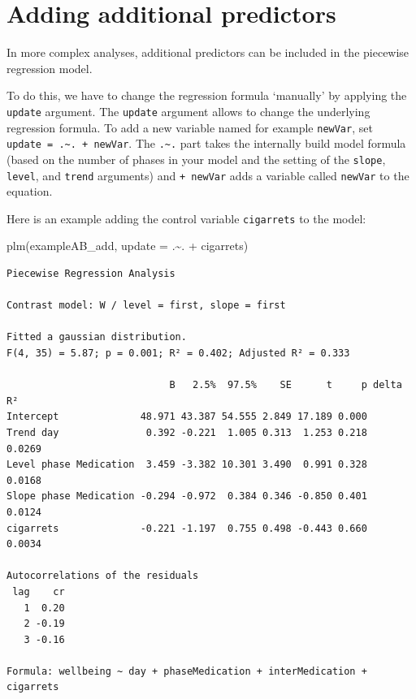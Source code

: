 \documentclass[
  letterpaper,
  DIV=11,
  numbers=noendperiod]{scrreprt}
\newenvironment{Shaded}{\begin{snugshade}}{\end{snugshade}}
\newcommand{\AttributeTok}[1]{\textcolor[rgb]{0.40,0.45,0.13}{#1}}
\newcommand{\FunctionTok}[1]{\textcolor[rgb]{0.28,0.35,0.67}{#1}}
\newcommand{\NormalTok}[1]{\textcolor[rgb]{0.00,0.23,0.31}{#1}}
\newcommand{\SpecialCharTok}[1]{\textcolor[rgb]{0.37,0.37,0.37}{#1}}
\begin{document}
\hypertarget{adding-additional-predictors}{%
\section{Adding additional
predictors}\label{adding-additional-predictors}}

In more complex analyses, additional predictors can be included in the
piecewise regression model.

To do this, we have to change the regression formula `manually' by
applying the \texttt{update} argument. The \texttt{update} argument
allows to change the underlying regression formula. To add a new
variable named for example \texttt{newVar}, set
\texttt{update\ =\ .\textasciitilde{}.\ +\ newVar}. The
\texttt{.\textasciitilde{}.} part takes the internally build model
formula (based on the number of phases in your model and the setting of
the \texttt{slope}, \texttt{level}, and \texttt{trend} arguments) and
\texttt{+\ newVar} adds a variable called \texttt{newVar} to the
equation.

Here is an example adding the control variable \texttt{cigarrets} to the
model:

\begin{Shaded}
\begin{Highlighting}[]
\FunctionTok{plm}\NormalTok{(exampleAB\_add, }\AttributeTok{update =}\NormalTok{ .}\SpecialCharTok{\textasciitilde{}}\NormalTok{. }\SpecialCharTok{+}\NormalTok{ cigarrets)}
\end{Highlighting}
\end{Shaded}

\begin{verbatim}
Piecewise Regression Analysis

Contrast model: W / level = first, slope = first

Fitted a gaussian distribution.
F(4, 35) = 5.87; p = 0.001; R² = 0.402; Adjusted R² = 0.333

                            B   2.5%  97.5%    SE      t     p delta R²
Intercept              48.971 43.387 54.555 2.849 17.189 0.000         
Trend day               0.392 -0.221  1.005 0.313  1.253 0.218   0.0269
Level phase Medication  3.459 -3.382 10.301 3.490  0.991 0.328   0.0168
Slope phase Medication -0.294 -0.972  0.384 0.346 -0.850 0.401   0.0124
cigarrets              -0.221 -1.197  0.755 0.498 -0.443 0.660   0.0034

Autocorrelations of the residuals
 lag    cr
   1  0.20
   2 -0.19
   3 -0.16

Formula: wellbeing ~ day + phaseMedication + interMedication + cigarrets
\end{verbatim}
\end{document}

